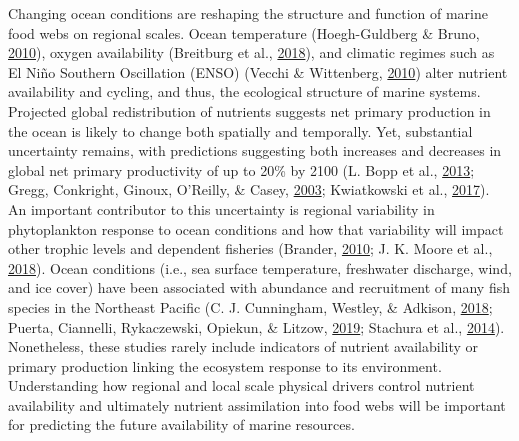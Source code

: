 \documentclass [11pt, proquest] {uwthesis}[2015/03/03]
\begin{document}
Changing ocean conditions are reshaping the structure and function of
marine food webs on regional scales. Ocean temperature (Hoegh-Guldberg
\& Bruno, \protect\hyperlink{ref-Hoegh2010}{2010}), oxygen availability
(Breitburg et al., \protect\hyperlink{ref-Brietburg2018}{2018}), and
climatic regimes such as El Niño Southern Oscillation (ENSO) (Vecchi \&
Wittenberg, \protect\hyperlink{ref-Vecchi2010}{2010}) alter nutrient
availability and cycling, and thus, the ecological structure of marine
systems. Projected global redistribution of nutrients suggests net
primary production in the ocean is likely to change both spatially and
temporally. Yet, substantial uncertainty remains, with predictions
suggesting both increases and decreases in global net primary
productivity of up to 20\% by 2100 (L. Bopp et al.,
\protect\hyperlink{ref-Bopp2013}{2013}; Gregg, Conkright, Ginoux,
O'Reilly, \& Casey, \protect\hyperlink{ref-Gregg2003}{2003}; Kwiatkowski
et al., \protect\hyperlink{ref-Kwiatkowski2017}{2017}). An important
contributor to this uncertainty is regional variability in phytoplankton
response to ocean conditions and how that variability will impact other
trophic levels and dependent fisheries (Brander,
\protect\hyperlink{ref-Brander2010}{2010}; J. K. Moore et al.,
\protect\hyperlink{ref-Moore2018}{2018}). Ocean conditions (i.e., sea
surface temperature, freshwater discharge, wind, and ice cover) have
been associated with abundance and recruitment of many fish species in
the Northeast Pacific (C. J. Cunningham, Westley, \& Adkison,
\protect\hyperlink{ref-Cunningham2018}{2018}; Puerta, Ciannelli,
Rykaczewski, Opiekun, \& Litzow,
\protect\hyperlink{ref-Puerta2019}{2019}; Stachura et al.,
\protect\hyperlink{ref-Stachura2014}{2014}). Nonetheless, these studies
rarely include indicators of nutrient availability or primary production
linking the ecosystem response to its environment. Understanding how
regional and local scale physical drivers control nutrient availability
and ultimately nutrient assimilation into food webs will be important
for predicting the future availability of marine resources.
\end{document}
